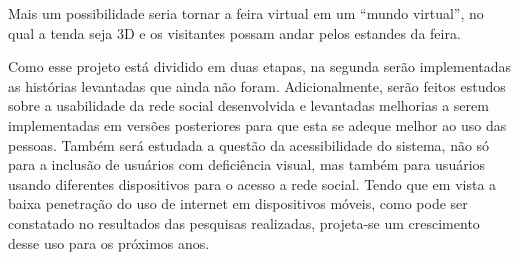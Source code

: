 Mais um possibilidade seria tornar a feira virtual em um “mundo virtual”, no qual a tenda seja 3D e os visitantes possam andar pelos estandes da feira.

Como esse projeto está dividido em duas etapas, na segunda serão implementadas as histórias levantadas que ainda não foram. Adicionalmente, serão feitos estudos sobre a usabilidade da rede social desenvolvida e levantadas melhorias a serem implementadas em versões posteriores para que esta se adeque melhor ao uso das pessoas. Também será estudada a questão da acessibilidade do sistema, não só para a inclusão de usuários com deficiência visual, mas também para usuários usando diferentes dispositivos para o acesso a rede social. Tendo que em vista a baixa penetração do uso de internet em dispositivos móveis, como pode ser constatado no resultados das pesquisas realizadas, projeta-se um crescimento desse uso para os próximos anos.


